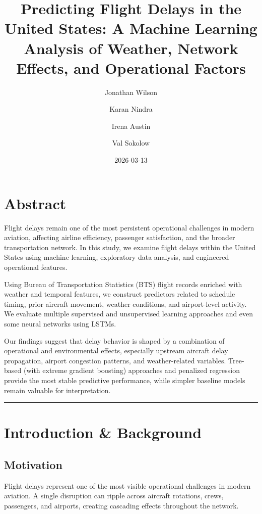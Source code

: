 \documentclass[
  letterpaper,
  DIV=11,
  numbers=noendperiod]{scrartcl}
\title{Predicting Flight Delays in the United States: A Machine Learning
Analysis of Weather, Network Effects, and Operational Factors}
\author{Jonathan Wilson \and Karan Nindra \and Irena Austin \and Val
Sokolow}
\date{2026-03-13}
\begin{document}
\maketitle


\section{Abstract}\label{abstract}

Flight delays remain one of the most persistent operational challenges
in modern aviation, affecting airline efficiency, passenger
satisfaction, and the broader transportation network. In this study, we
examine flight delays within the United States using machine learning,
exploratory data analysis, and engineered operational features.

Using Bureau of Transportation Statistics (BTS) flight records enriched
with weather and temporal features, we construct predictors related to
schedule timing, prior aircraft movement, weather conditions, and
airport-level activity. We evaluate multiple supervised and unsupervised
learning approaches and even some neural networks using LSTMs.

Our findings suggest that delay behavior is shaped by a combination of
operational and environmental effects, especially upstream aircraft
delay propagation, airport congestion patterns, and weather-related
variables. Tree-based (with extreme gradient boosting) approaches and
penalized regression provide the most stable predictive performance,
while simpler baseline models remain valuable for interpretation.

\begin{center}\rule{0.5\linewidth}{0.5pt}\end{center}

\section{Introduction \& Background}\label{introduction-background}

\subsection{Motivation}\label{motivation}

Flight delays represent one of the most visible operational challenges
in modern aviation. A single disruption can ripple across aircraft
rotations, crews, passengers, and airports, creating cascading effects
throughout the network.
\end{document}
